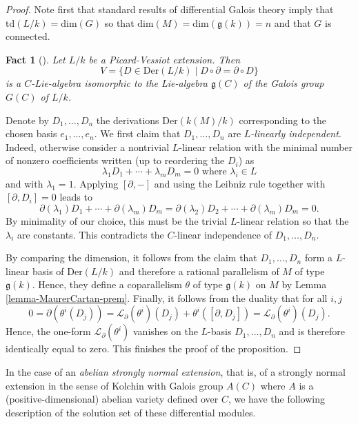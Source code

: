 \documentclass[12pt]{amsart}
\theoremstyle{definition}
\theoremstyle{plain}
\newtheorem{fact}[defn]{Fact}
\theoremstyle{exampstyle}\newtheorem{thmx}{Theorem}
\theoremstyle{exampstyle}\newtheorem{thmxbis}{Theorem}
\begin{document}
\begin{proof} 
Note first that standard results of differential Galois theory imply that $\mathrm{td}(L/k) = \mathrm{dim}(G)$ so that $\mathrm{dim}(M) = \mathrm{dim}(\mathfrak{g}(k)) = n$ and that $G$ is connected. 

\begin{fact}[{\cite[Proposition 1.24]{vdP-Singer}}]
Let $L/k$ be a Picard-Vessiot extension. Then 
$$V= \lbrace D \in \mathrm{Der}(L/k) \mid D \circ \partial = \partial \circ D \rbrace$$
is a $C$-Lie-algebra isomorphic to the Lie-algebra $\mathfrak{g}(C)$ of the Galois group $G(C)$ of $L/k$.
\end{fact} 

Denote by $D_1,\ldots, D_n$ the derivations $\mathrm{Der}(k(M)/k)$ corresponding to the chosen basis $e_1,\ldots, e_n$. We first claim that  $D_1,\ldots, D_n$ are {\em $L$-linearly independent}. Indeed, otherwise consider a nontrivial $L$-linear relation with the minimal number of nonzero coefficients written  (up to reordering the $D_i$) as
$$\lambda_1 D_1 + \cdots + \lambda_m D_m = 0 \text{ where } \lambda_i \in L$$
and with $\lambda_1 = 1.$ Applying $[\partial, -]$ and using the Leibniz rule together with $[\partial, D_i] = 0$ leads to 
$$ \partial(\lambda_1) D_1 + \cdots + \partial(\lambda_m) D_m = \partial(\lambda_2) D_2 + \cdots + \partial(\lambda_m) D_m = 0.$$
By minimality of our choice, this must be the trivial $L$-linear relation so that the $\lambda_i$ are constants. This contradicts the $C$-linear independence of $D_1,\ldots,D_n$. 

By comparing the dimension, it follows from the claim that $D_1,\ldots, D_n$ form a $L$-linear basis of $\mathrm{Der}(L/k)$ and therefore a rational parallelism of $M$ of type $\mathfrak{g}(k)$. Hence, they define a coparallelism $\theta$ of type $\mathfrak{g}(k)$ on $M$ by Lemma \ref{lemma-MaurerCartan-prem}. Finally, it follows from the duality that for all $i,j$
$$ 0 = \partial(\theta^i(D_j)) = \mathcal L_\partial(\theta^i)(D_j) + \theta^i([\partial, D_j]) = \mathcal L_\partial(\theta^i)(D_j).$$
Hence, the one-form $\mathcal L_\partial(\theta^i)$ vanishes on the $L$-basis $D_1,\ldots,D_n$ and is therefore identically equal to zero. This finishes the proof of the proposition.
\end{proof} 


In the case of an {\em abelian strongly normal extension}, that is, of a strongly normal extension in the sense of Kolchin with Galois group $A(C)$ where $A$ is a (positive-dimensional) abelian variety defined over $C$, we have the following description of the solution set of these differential modules. 
\end{document}
